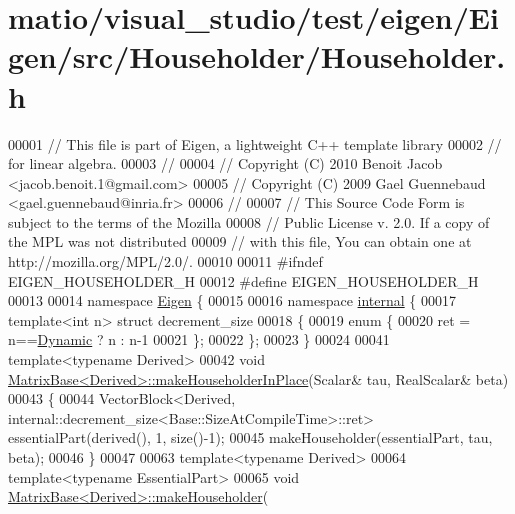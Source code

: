 \hypertarget{matio_2visual__studio_2test_2eigen_2_eigen_2src_2_householder_2_householder_8h_source}{}\section{matio/visual\+\_\+studio/test/eigen/\+Eigen/src/\+Householder/\+Householder.h}
\label{matio_2visual__studio_2test_2eigen_2_eigen_2src_2_householder_2_householder_8h_source}

\begin{DoxyCode}
00001 \textcolor{comment}{// This file is part of Eigen, a lightweight C++ template library}
00002 \textcolor{comment}{// for linear algebra.}
00003 \textcolor{comment}{//}
00004 \textcolor{comment}{// Copyright (C) 2010 Benoit Jacob <jacob.benoit.1@gmail.com>}
00005 \textcolor{comment}{// Copyright (C) 2009 Gael Guennebaud <gael.guennebaud@inria.fr>}
00006 \textcolor{comment}{//}
00007 \textcolor{comment}{// This Source Code Form is subject to the terms of the Mozilla}
00008 \textcolor{comment}{// Public License v. 2.0. If a copy of the MPL was not distributed}
00009 \textcolor{comment}{// with this file, You can obtain one at http://mozilla.org/MPL/2.0/.}
00010 
00011 \textcolor{preprocessor}{#ifndef EIGEN\_HOUSEHOLDER\_H}
00012 \textcolor{preprocessor}{#define EIGEN\_HOUSEHOLDER\_H}
00013 
00014 \textcolor{keyword}{namespace }\hyperlink{namespace_eigen}{Eigen} \{ 
00015 
00016 \textcolor{keyword}{namespace }\hyperlink{namespaceinternal}{internal} \{
00017 \textcolor{keyword}{template}<\textcolor{keywordtype}{int} n> \textcolor{keyword}{struct }decrement\_size
00018 \{
00019   \textcolor{keyword}{enum} \{
00020     ret = n==\hyperlink{namespace_eigen_ad81fa7195215a0ce30017dfac309f0b2}{Dynamic} ? n : n-1
00021   \};
00022 \};
00023 \}
00024 
00041 \textcolor{keyword}{template}<\textcolor{keyword}{typename} Derived>
00042 \textcolor{keywordtype}{void} \hyperlink{group___core___module_aebf4bac7dffe2685ab93734fb776e817}{MatrixBase<Derived>::makeHouseholderInPlace}(Scalar& tau, 
      RealScalar& beta)
00043 \{
00044   VectorBlock<Derived, internal::decrement\_size<Base::SizeAtCompileTime>::ret> essentialPart(derived(), 1, 
      size()-1);
00045   makeHouseholder(essentialPart, tau, beta);
00046 \}
00047 
00063 \textcolor{keyword}{template}<\textcolor{keyword}{typename} Derived>
00064 \textcolor{keyword}{template}<\textcolor{keyword}{typename} EssentialPart>
00065 \textcolor{keywordtype}{void} \hyperlink{group___core___module_a13291e900f7e81ddc6e5b8802f82092b}{MatrixBase<Derived>::makeHouseholder}(

\end{DoxyCode}
